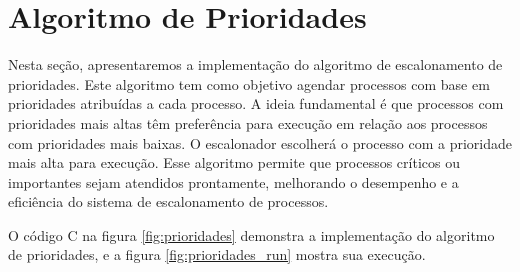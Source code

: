 \documentclass[
	12pt,				%
	openright,			%
	oneside,			%
	a4paper,			%
	chapter=TITLE,		%
	english,			%
	french,				%
	spanish,			%
	brazil				%
	]{abntex2}
\theoremstyle{definition}
\begin{document}

\section{Algoritmo de Prioridades}
Nesta seção, apresentaremos a implementação do algoritmo de escalonamento de prioridades. 
Este algoritmo tem como objetivo agendar processos com base em prioridades atribuídas a cada processo. 
A ideia fundamental é que processos com prioridades mais altas têm preferência para execução em relação 
aos processos com prioridades mais baixas. O escalonador escolherá o processo com a prioridade mais alta 
para execução. Esse algoritmo permite que processos críticos ou importantes sejam atendidos prontamente, 
melhorando o desempenho e a eficiência do sistema de escalonamento de processos.

O código C na figura \ref{fig:prioridades} demonstra a implementação do algoritmo 
de prioridades, e a figura \ref{fig:prioridades_run} mostra sua execução.
\end{document}
